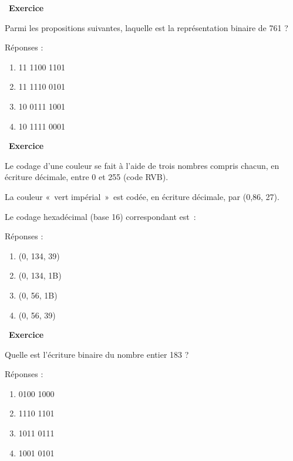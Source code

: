 \documentclass[
  11pt,
]{article}
\providecommand{\tightlist}{%
  \setlength{\itemsep}{0pt}\setlength{\parskip}{0pt}}
\newcounter{exo}
\newenvironment{exercice}[1]
{\par \medskip   \addtocounter{exo}{1} \noindent  
\begin{bclogo}[arrondi =0.1,   noborder = true, logo=\bccrayon, marge=4]{~\textbf{Exercice} \textbf{\theexo} {\itshape #1} }  \par}
{
\end{bclogo}
 \par \bigskip }
\newcounter{prop}
\newcounter{def}
\begin{document}
\begin{exercice}{}

Parmi les propositions suivantes, laquelle est la représentation binaire
de 761 ?

Réponses :

\begin{enumerate}
\def\labelenumi{\arabic{enumi}.}
\tightlist
\item
  11 1100 1101
\item
  11 1110 0101
\item
  10 0111 1001
\item
  10 1111 0001
\end{enumerate}

\end{exercice}

\begin{exercice}{}

Le codage d'une couleur se fait à l'aide de trois nombres compris
chacun, en écriture décimale, entre 0 et 255 (code RVB).

La couleur «~vert impérial~»~est codée, en écriture décimale, par (0,86,
27).

Le codage hexadécimal (base 16) correspondant est~:

Réponses :

\begin{enumerate}
\def\labelenumi{\arabic{enumi}.}
\tightlist
\item
  (0, 134, 39)
\item
  (0, 134, 1B)
\item
  (0, 56, 1B)
\item
  (0, 56, 39)
\end{enumerate}

\end{exercice}

\begin{exercice}{}

Quelle est l'écriture binaire du nombre entier 183 ?

Réponses :

\begin{enumerate}
\def\labelenumi{\arabic{enumi}.}
\tightlist
\item
  0100 1000
\item
  1110 1101
\item
  1011 0111
\item
  1001 0101
\end{enumerate}

\end{exercice}
\end{document}
